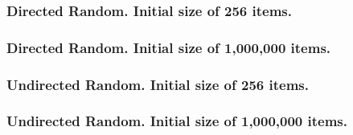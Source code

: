 \clearpage
\subsubsection{Directed Random. Initial size of 256 items.}



\clearpage
\subsubsection{Directed Random. Initial size of  1,000,000 items.}



\clearpage
\subsubsection{Undirected Random. Initial size of 256 items.}



\clearpage
\subsubsection{Undirected Random. Initial size of  1,000,000 items.}




